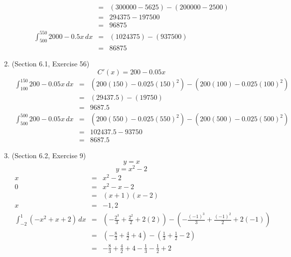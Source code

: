 \documentclass{article}
\begin{document}
\begin{enumerate}
\begin{eqnarray}
                                              &=& \left(300000 - 5625\right) - \left(200000 - 2500\right) \\
                                              &=& 294375 - 197500 \\
                                              &=& 96875 \\
            \int_{500}^{550}{2000 - 0.5x\,dx} &=& \left(1024375\right) - \left(937500\right) \\
                                              &=& 86875
        \end{eqnarray}
    \item (Section 6.1, Exercise 56)
        $$C'(x) = 200 - 0.05x$$
        \begin{eqnarray}
            \int_{100}^{150}{200 - 0.05x\,dx} &=& \left(200(150) - 0.025(150)^2\right) - \left(200(100) - 0.025(100)^2\right) \\
                                              &=& \left(29437.5\right) - \left(19750\right) \\
                                              &=& 9687.5 \\
            \int_{500}^{500}{200 - 0.05x\,dx} &=& \left(200(550) - 0.025(550)^2\right) - \left(200(500) - 0.025(500)^2\right) \\
                                              &=& 102437.5 - 93750 \\
                                              &=& 8687.5
        \end{eqnarray}
    \item (Section 6.2, Exercise 9)
        $$y = x$$
        $$y = x^2 - 2$$
        \begin{eqnarray}
            x &=& x^2 - 2 \\
            0 &=& x^2 - x - 2 \\
              &=& \left(x + 1\right)\left(x - 2\right) \\
            x &=& -1, 2 \\
            \int_{-2}^1{\left(- x^2 + x + 2\right)\,dx} &=& \left(-\frac{2^3}{3} + \frac{2^2}{2} + 2(2)\right) - \left(-\frac{(-1)^3}{3} + \frac{(-1)^2}{2} + 2(-1)\right) \\
                                                        &=& \left(-\frac{8}{3} + \frac{4}{2} + 4\right) - \left(\frac{1}{3} + \frac{1}{2} - 2\right) \\
                                                        &=& -\frac{8}{3} + \frac{4}{2} + 4 - \frac{1}{3} - \frac{1}{2} + 2 \\

\end{eqnarray}
\end{enumerate}
\end{document}
